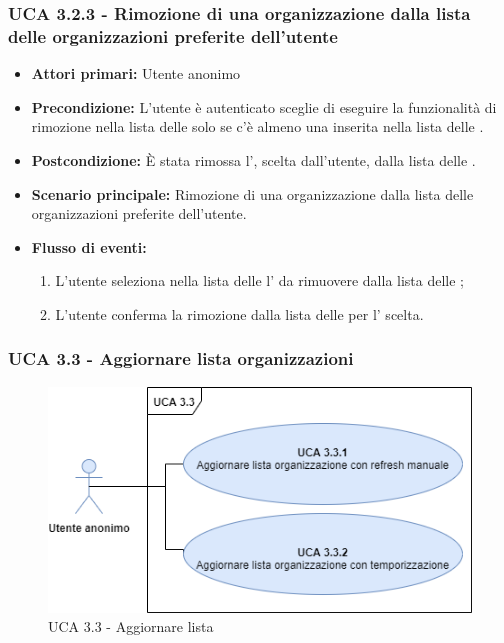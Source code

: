 \subsubsection{UCA 3.2.3 - Rimozione di una organizzazione dalla lista delle organizzazioni preferite dell'utente}%
\begin{itemize}
	\item \textbf{Attori primari:} Utente anonimo
	\item \textbf{Precondizione:}  L'utente è autenticato sceglie di eseguire la funzionalità di rimozione nella lista delle  solo se c'è almeno una  inserita nella lista delle .
	\item \textbf{Postcondizione:} È stata rimossa l', scelta dall'utente, dalla lista delle .
	\item \textbf{Scenario principale:} Rimozione di una organizzazione dalla lista delle organizzazioni preferite dell'utente.
	\item \textbf{Flusso di eventi:}
	\begin{enumerate}
		\item L'utente seleziona nella lista delle  l' da rimuovere dalla lista delle ;
		\item L'utente conferma la rimozione dalla lista delle  per l' scelta.
	\end{enumerate}
\end{itemize}

\subsubsection{UCA 3.3 - Aggiornare lista organizzazioni}%

\begin{figure}[h]
	\centering
	\includegraphics[scale=0.5, center]{Sezioni/UseCase/Immagini/UCA3.3.png}
	\caption{UCA 3.3 - Aggiornare lista }
\end{figure}

